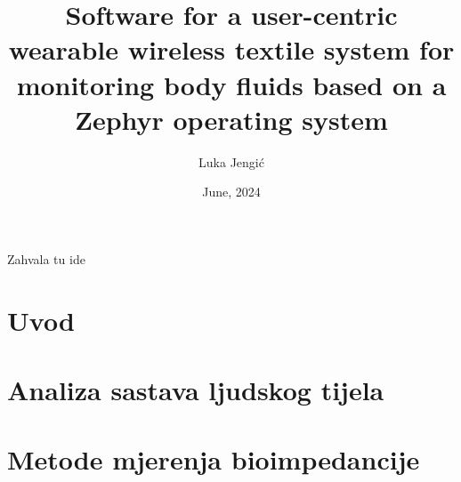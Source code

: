 \documentclass[diplomskirad, numeric, utf8, times]{fer}
\title{Software for a user-centric wearable wireless textile system for monitoring body fluids based on a Zephyr operating system}
\author{Luka Jengić}
\date{June, 2024}
\begin{document}
\maketitle






\begin{zahvale}
  Zahvala tu ide
\end{zahvale}


\mainmatter


\tableofcontents


\chapter{Uvod}
\label{pog:uvod}



\chapter{Analiza sastava ljudskog tijela}
\label{pog:glavni_dio}



\chapter{Metode mjerenja bioimpedancije}
\label{chap:bioz}



\end{document}
